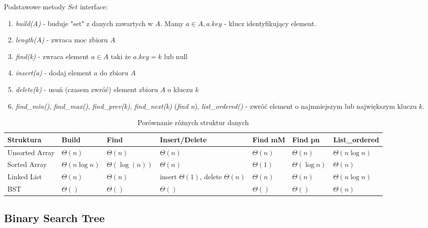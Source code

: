 \documentclass{article}
\numberwithin{equation}{subsection}
\begin{document}
\noindent
Podstawowe metody $Set$ interface:
\begin{enumerate}
    \item \textit{build(A)} - buduje "set" z danych zawartych w $A$. Mamy $a\in A, a.key$ - klucz identyfikujący element.
    \item \textit{length(A)} - zwraca moc zbioru $A$
    \item \textit{find(k)} - zwraca element $a\in A \text{ taki że } a.key = k \text{ lub null}$
    \item \textit{insert(a)} - dodaj element $a$ do zbioru $A$
    \item \textit{delete(k)} - usuń (czasem zwróć) element zbioru $A$ o kluczu $k$
    \item \textit{find\_min()}, \textit{find\_max()}, \textit{find\_prev(k)}, \textit{find\_next(k)} (\textit{find n}), \textit{list\_ordered()} - zwróć element o najmniejszym lub największym kluczu $k$.
\end{enumerate}

\begin{table}[h!]
\centering
\begin{tabular}{|l|l|l|l|l|l|l|}
\hline
\textbf{Struktura} & \textbf{Build} & \textbf{Find} & \textbf{Insert/Delete} & \textbf{Find mM} & \textbf{Find pn} & \textbf{List\_ordered} \\ \hline
Unsorted Array & $\Theta(n)$ & $\Theta(n)$ & $\Theta(n)$ & $\Theta(n)$ & $\Theta(n)$ & $\Theta(n\log n) $ \\ \hline
Sorted Array & $\Theta(n\log n)$ & $\Theta(\log(n))$ & $\Theta(n)$ & $\Theta(1)$ & $\Theta(\log n)$ & $\Theta(n)$ \\ \hline
Linked List & $\Theta(n)$ & $\Theta(n)$ & insert $\Theta(1)$, delete $\Theta(n)$ & $\Theta(n)$ & $\Theta(n)$ & $\Theta(n\log n)$ \\ \hline
BST & $\Theta()$ & $\Theta()$ & $\Theta()$ & $\Theta()$ & $\Theta()$ & $\Theta(n)$\\ \hline

\end{tabular}
\caption{Porównanie różnych struktur danych}
\label{tab:structure_comparison}
\end{table}

\subsection{Binary Search Tree}
\end{document}
